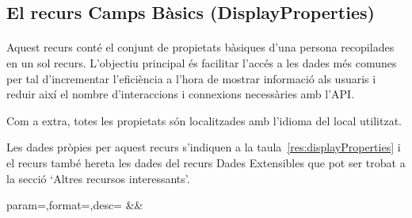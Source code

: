 \subsection{El recurs Camps Bàsics (DisplayProperties)}

    \paragraph{}
    Aquest recurs conté el conjunt de propietats bàsiques d'una persona recopilades en un sol recurs. L'objectiu principal és facilitar l'accés a les dades més comunes per tal d'incrementar l'eficiència a l'hora de mostrar informació als usuaris i reduir així el nombre d'interaccions i connexions necessàries amb l'API.

    Com a extra, totes les propietats són localitzades amb l'idioma del local utilitzat.

    Les dades pròpies per aquest recurs s'indiquen a la taula~\ref{res:displayProperties} i el recurs també hereta les dades del recurs Dades Extensibles que pot ser trobat a la secció `Altres recursos interessants'.

    \begin{center}
             {param=\param,format=\format,desc=\desc}
             {\param&\format&\desc}
     \end{center}
